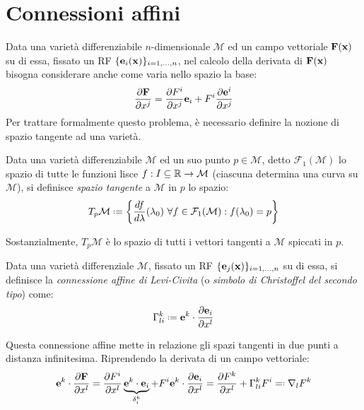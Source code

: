 
\section{Connessioni affini}

Data una varietà differenziabile $ n $-dimensionale $ \mathcal{M} $ ed un campo vettoriale $ \mathbf{F}(\mathbf{x}) $ su di essa, fissato un RF $ \{\mathbf{e}_i (\mathbf{x})\}_{i = 1, \dots, n} $, nel calcolo della derivata di $ \mathbf{F}(\mathbf{x}) $ bisogna considerare anche come varia nello spazio la base:
\begin{equation}
	\frac{\partial \mathbf{F}}{\partial x^j} = \frac{\partial F^i}{\partial x^j} \mathbf{e}_i + F^i \frac{\partial \mathbf{e}^i}{\partial x^j}
	\label{eq:4.1}
\end{equation}
Per trattare formalmente questo problema, è necessario definire la nozione di spazio tangente ad una varietà.
\begin{definition}
	Data una varietà differenziabile $ \mathcal{M} $ ed un suo punto $ p \in \mathcal{M} $, detto $ \mathcal{F}_1(\mathcal{M}) $ lo spazio di tutte le funzioni lisce $ f : I \subseteq \mathbb{R} \rightarrow \mathcal{M} $ (ciascuna determina una curva su $ \mathcal{M} $), si definisce \textit{spazio tangente} a $ \mathcal{M} $ in $ p $ lo spazio:
	\begin{equation}
		T_p\mathcal{M} \defeq \biggl\{ \frac{df}{d\lambda}(\lambda_0) \,\,\forall f \in \mathcal{F}_1(\mathcal{M}) : f(\lambda_0) = p \biggl\}
		\label{eq:4.2}
	\end{equation}
\end{definition}
Sostanzialmente, $ T_p\mathcal{M} $ è lo spazio di tutti i vettori tangenti a $ \mathcal{M} $ spiccati in $ p $.
\begin{definition}
	Data una varietà differenziale $ \mathcal{M} $, fissato un RF $ \{\mathbf{e}_j(\mathbf{x})\}_{i = 1, \dots, n} $ su di essa, si definisce la \textit{connessione affine di Levi-Civita} (o \textit{simbolo di Christoffel del secondo tipo}) come:
	\begin{equation}
		\Gamma^k_{li} \defeq \ve{e}^k \cdot \frac{\pa \ve{e}_i}{\pa x^l}
		\label{eq:4.3}
	\end{equation}
\end{definition}
Questa connessione affine mette in relazione gli spazi tangenti in due punti a distanza infinitesima.
Riprendendo la derivata di un campo vettoriale:
\begin{equation}
	\ve{e}^k \cdot \frac{\pa \ve{F}}{\pa x^l} = \frac{\pa F^i}{\pa x^l} \underbrace{\ve{e}^k \cdot \ve{e}_i}_{\delta^k_i} + F^i \ve{e}^k \cdot \frac{\pa \ve{e}_i}{\pa x^l} = \frac{\pa F^k}{\pa x^l} + \Gamma^k_{li} F^i \eqdef \nabla_l F^k
	\label{eq:4.4}
\end{equation}
